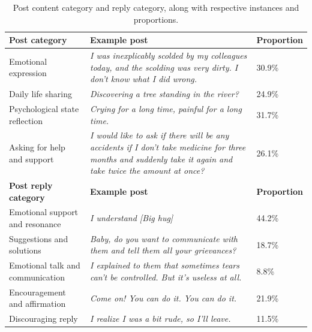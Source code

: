 \begin{table}[th]
	\small
    \centering
	\begin{tabular}{p{}|p{}|p{}}
		\toprule
		\textbf{Post category} & \textbf{Example post} & \textbf{Proportion}\\ \midrule
		Emotional expression & \textit{I was inexplicably scolded by my colleagues today, and the scolding was very dirty. I don't know what I did wrong.} & 30.9\% \\ \midrule
		Daily life sharing & \textit{Discovering a tree standing in the river?} & 24.9\%  \\ \midrule
        Psychological state reflection & \textit{Crying for a long time, painful for a long time.} & 31.7\%  \\ \midrule
        Asking for help and support & \textit{I would like to ask if there will be any accidents if I don't take medicine for three months and suddenly take it again and take twice the amount at once?} & 26.1\%   \\ \midrule \midrule
        \textbf{Post reply category} & \textbf{Example post} & \textbf{Proportion}\\ \midrule
		Emotional support and resonance & \textit{I understand [Big hug]} & 44.2\%\\ \midrule
		Suggestions and solutions & \textit{Baby, do you want to communicate with them and tell them all your grievances?} & 18.7\%  \\ \midrule
        Emotional talk and communication & \textit{I explained to them that sometimes tears can't be controlled. But it's useless at all.}  & 8.8\% \\ \midrule
        Encouragement and affirmation & \textit{Come on! You can do it. You can do it.} & 21.9\%  \\ \midrule
        Discouraging reply & \textit{I realize I was a bit rude, so I'll leave. } & 11.5\%  \\ \midrule
	\end{tabular}
	\caption{Post content category and reply category, along with respective instances and proportions.}
	\label{tab:Post_category}
\end{table}

